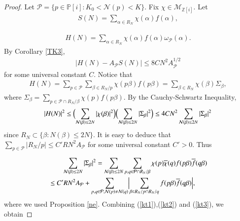 \documentclass[12pt,amstex]{amsart}
\theoremstyle{definition}
\def \Z {\mathbb{Z}[i]}
\def \P {\mathbb{P}[i]}
\def \A {\alpha}
\def \B {\beta}
\begin{document}
\begin{proof}
 Let $\mathcal{P}=\{p\in\P\colon K_{0}<\mathcal{N}(p)<K\}$. Fix $\chi\in\mathcal{M}_{\Z}$. Let
\begin{equation}\nonumber
  \begin{split}
    S(N)=\sum_{\A\in R_{N}}\chi(\A)f(\A),
  \end{split}
\end{equation}

\begin{equation}\nonumber
  \begin{split}
    H(N)=\sum_{\A\in R_{N}}\chi(\A)f(\A)\omega_{\mathcal{P}}(\A).
  \end{split}
\end{equation}
 By Corollary \ref{TK3},
\begin{equation}\label{kt1}
  \begin{split}
    \vert H(N)-A_{\mathcal{P}}S(N)\vert\leq 8CN^{2}A_{\mathcal{P}}^{1/2}
  \end{split}
\end{equation}
for some universal constant $C$.
Notice that
\begin{equation}\nonumber
  \begin{split}
    H(N)=\sum_{p\in\mathcal{P}}\sum_{\B\in R_{N}/p}\chi(p\B)f(p\B)=\sum_{\B\in R_{N}}\chi(\B)\Sigma_{\B},
  \end{split}
\end{equation}
where $\Sigma_{\B}=\sum_{p\in\mathcal{P}\cap R_{N}/\B}\chi(p)f(p\B)$. By the Cauchy-Schwartz Inequality,
\begin{equation}\label{kt2}
  \begin{split}
    \vert H(N)\vert^{2}\leq\Bigl(\sum_{\mathcal{N}(\B)\leq 2N}\vert\chi(\B)\vert^{2}\Bigr)\Bigl(\sum_{\mathcal{N}(\B)\leq 2N}\vert\Sigma_{\B}\vert^{2}\Bigr)\leq 4CN^{2}\sum_{\mathcal{N}(\B)\leq 2N}\vert\Sigma_{\B}\vert^{2}
  \end{split}
\end{equation}
since $R_{N}\subset \{\B\colon N(\B)\leq 2N\}$.
It is easy to deduce that $\sum_{p\in\mathcal{P}}\vert R_{N}/p\vert\leq C'RN^{2}A_{\mathcal{P}}$ for some universal constant $C'>0$. Thus

\begin{equation}\label{kt3}
  \begin{split}
    &\qquad\sum_{\mathcal{N}(\B)\leq 2N}\vert\Sigma_{\B}\vert^{2}=\sum_{\mathcal{N}(\B)\leq 2N}\sum_{p,q\in\mathcal{P}\cap R_{N}/\B}\chi(p)\overline{\chi}(q)f(p\B)\overline{f}(q\B)
    \\&\leq C'RN^{2}A_{\mathcal{P}}+\sum_{p,q\in\mathcal{P},\mathcal{N}(p)\neq \mathcal{N}(q)}\Bigl\vert \sum_{\B\in R_{N}/p\cap R_{N}/q}f(p\B)\overline{f}(q\B)\Bigr\vert,
  \end{split}
\end{equation}
where we used Proposition \ref{ne}. Combining (\ref{kt1}),(\ref{kt2}) and (\ref{kt3}), we obtain


\end{proof}
\end{document}
